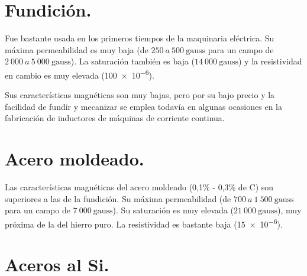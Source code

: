\documentclass[12pt,a4paper]{article}
\begin{document}

\section{Fundición.}

Fue bastante usada en los primeros tiempos de la maquinaria eléctrica. Su máxima permeabilidad es muy baja (de $250\ a\ 500\ \mathrm{gauss}$ para un campo de $2\ 000\ a\ 5\ 000\ \mathrm{gauss}$). La saturación también es baja ($14\ 000\ \mathrm{gauss}$) y la resistividad en cambio es muy elevada (\SI{100e-6}{\Omega}). 

Sus características magnéticas son muy bajas, pero por su bajo precio y la facilidad de fundir y mecanizar se emplea todavía en algunas ocasiones en la fabricación de inductores de máquinas de corriente continua.

\section{Acero moldeado.}

Las características magnéticas del acero moldeado (0,1\% - 0,3\% de C) son superiores a las de la fundición. Su máxima permeabilidad (de $700\ a\ 1\ 500\ \mathrm{gauss}$ para un campo de $7\ 000\ \mathrm{gauss}$). Su saturación es muy elevada ($21\ 000\ \mathrm{gauss}$), muy próxima de la del hierro puro. La resistividad es bastante baja (\SI{15e-6}{\Omega}).

\section{Aceros al Si.}
\end{document}
